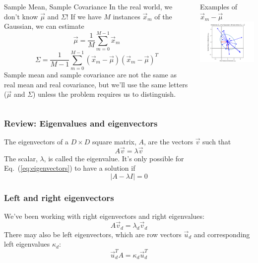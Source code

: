 \documentclass{beamer}
\begin{document}
\begin{frame}
  \begin{columns}
    \column{2.25in}
    \begin{block}{Sample Mean, Sample Covariance}
      In the real world, we don't know $\vec\mu$ and $\Sigma$!
      If we have $M$  instances $\vec{x}_m$  of the Gaussian,
      we can estimate
      \[
      \vec\mu=\frac{1}{M}\sum_{m=0}^{M-1}\vec{x}_m
      \]
      \[
      \Sigma=\frac{1}{M-1}\sum_{m=0}^{M-1}(\vec{x}_m-\vec\mu)(\vec{x}_m-\vec\mu)^T
      \]
      Sample mean and sample covariance are not the same as real mean
      and real covariance, but we'll use the same letters ($\vec\mu$
      and $\Sigma$) unless the problem requires us to distinguish.
    \end{block}
    \column{2in}
    \begin{block}{Examples of $\vec{x}_m-\vec\mu$}
      \includegraphics[width=1.9in]{gaussian_subtraction.png}
    \end{block}
  \end{columns}
\end{frame}

\begin{frame}
  \frametitle{Review: Eigenvalues and eigenvectors}
  The eigenvectors of a $D\times D$ square matrix, $A$, are the
  vectors $\vec{v}$ such that
  \begin{equation}
    A\vec{v}=\lambda\vec{v}
    \label{eq:eigenvectors}
  \end{equation}
  The scalar, $\lambda$, is called the eigenvalue.  It's only possible
  for Eq.~(\ref{eq:eigenvectors}) to have a solution if
  \begin{equation}
    |A-\lambda I|=0
    \label{eq:eigenvalues}
  \end{equation}
\end{frame}

\begin{frame}
  \frametitle{Left and right eigenvectors}
  We’ve been working with right eigenvectors and right eigenvalues: 
  \[
  A\vec{v}_d =\lambda_d\vec{v}_d
  \]
  There may also be left eigenvectors, which are row vectors $\vec{u}_d$
  and corresponding left eigenvalues $\kappa_d$:
  \[
  \vec{u}_d^T A = \kappa_d\vec{u}_d^T
  \]
\end{frame}
\end{document}
